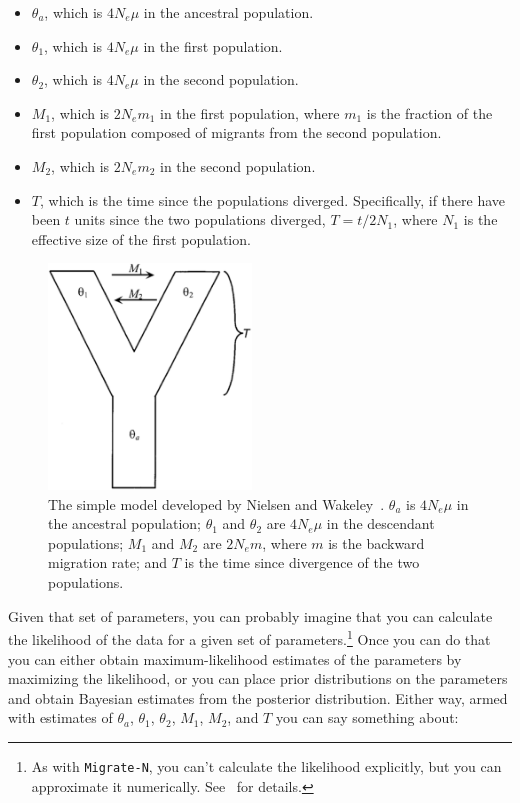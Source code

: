 \documentclass[12pt]{article}
\begin{document}
\begin{itemize}

\item $\theta_a$, which is $4N_e\mu$ in the ancestral population.

\item $\theta_1$, which is $4N_e\mu$ in the first population.

\item $\theta_2$, which is $4N_e\mu$ in the second population.

\item $M_1$, which is $2N_em_1$ in the first population, where $m_1$ is
  the fraction of the first population composed of migrants from the
  second population.

\item $M_2$, which is $2N_em_2$ in the second population.

\item $T$, which is the time since the populations
  diverged. Specifically, if there have been $t$ units since
  the two populations diverged, $T=t/2N_1$, where $N_1$ is the
  effective size of the first population.

\end{itemize}

\begin{figure}
\begin{center}
\includegraphics[height=6cm]{nielsen-wakeley.eps}
\end{center}
\caption{The simple model developed by Nielsen and
  Wakeley~\cite{Nielsen-Wakeley-2001}. $\theta_a$ is $4N_e\mu$ in the
  ancestral population; $\theta_1$ and $\theta_2$ are $4N_e\mu$ in the
  descendant populations; $M_1$ and $M_2$ are $2N_em$, where $m$ is
  the backward migration rate; and $T$ is the time since divergence of
  the two populations.}\label{fig:nielsen-wakeley}
\end{figure}

Given that set of parameters, you can probably imagine that you can
calculate the likelihood of the data for a given set of
parameters.\footnote{As with {\tt Migrate-N}, you can't calculate the
  likelihood explicitly, but you can approximate it
  numerically. See~\cite{Nielsen-Wakeley-2001} for details.} Once you
can do that you can either obtain maximum-likelihood estimates of the
parameters by maximizing the likelihood, or you can place prior
distributions on the parameters and obtain Bayesian estimates from the
posterior distribution. Either way, armed with estimates of
$\theta_a$, $\theta_1$, $\theta_2$, $M_1$, $M_2$, and $T$ you can say
something about:
\end{document}

